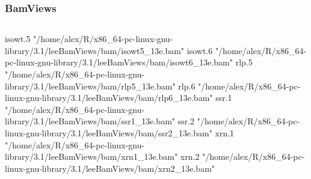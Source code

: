 \documentclass{beamer}
\begin{document}
\begin{frame}[fragile]
\frametitle{BamViews}
  \begin{column}{1.3\textwidth}
                        \begin{uncoverenv}
\begin{Schunk}
\begin{Soutput}
                                                                      isowt.5 
"/home/alex/R/x86_64-pc-linux-gnu-library/3.1/leeBamViews/bam/isowt5_13e.bam" 
                                                                      isowt.6 
"/home/alex/R/x86_64-pc-linux-gnu-library/3.1/leeBamViews/bam/isowt6_13e.bam" 
                                                                        rlp.5 
  "/home/alex/R/x86_64-pc-linux-gnu-library/3.1/leeBamViews/bam/rlp5_13e.bam" 
                                                                        rlp.6 
  "/home/alex/R/x86_64-pc-linux-gnu-library/3.1/leeBamViews/bam/rlp6_13e.bam" 
                                                                        ssr.1 
  "/home/alex/R/x86_64-pc-linux-gnu-library/3.1/leeBamViews/bam/ssr1_13e.bam" 
                                                                        ssr.2 
  "/home/alex/R/x86_64-pc-linux-gnu-library/3.1/leeBamViews/bam/ssr2_13e.bam" 
                                                                        xrn.1 
  "/home/alex/R/x86_64-pc-linux-gnu-library/3.1/leeBamViews/bam/xrn1_13e.bam" 
                                                                        xrn.2 
  "/home/alex/R/x86_64-pc-linux-gnu-library/3.1/leeBamViews/bam/xrn2_13e.bam" 
\end{Soutput}
\end{Schunk}
                        \end{uncoverenv}    
  \end{column}
\end{frame}
\end{document}
